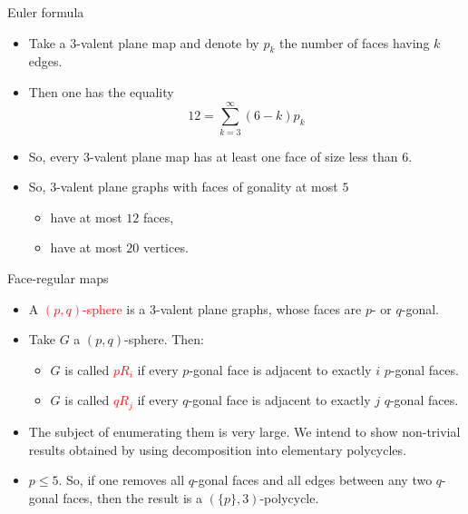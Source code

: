 \documentclass[%
pdf,
colorBG,
slideColor,
]{prosper}
\begin{document}
\begin{slide}{Euler formula}
\begin{itemize}
\item Take a $3$-valent plane map and denote by $p_k$ the number of faces having $k$ edges.
\item Then one has the equality
\begin{equation*}
12=\sum_{k=3}^{\infty} (6-k) p_k
\end{equation*}
\item So, every $3$-valent plane map has at least one face of size less than $6$.
\item So, $3$-valent plane graphs with faces of gonality at most $5$
\begin{itemize}
\item have at most $12$ faces,
\item have at most $20$ vertices.
\end{itemize}
\end{itemize}
\end{slide}




\begin{slide}{Face-regular maps}
\begin{itemize}
\item A \textcolor{red}{$(p,q)$-sphere} is a $3$-valent plane graphs, whose faces are $p$- or $q$-gonal.
\item Take $G$ a $(p,q)$-sphere. Then:
\begin{itemize}
\item $G$ is called \textcolor{red}{$pR_i$} if every $p$-gonal face is adjacent to exactly $i$ $p$-gonal faces.
\item $G$ is called \textcolor{red}{$qR_j$} if every $q$-gonal face is adjacent to exactly $j$ $q$-gonal faces.
\end{itemize}
\item The subject of enumerating them is very large. We intend to show non-trivial results obtained by using decomposition into elementary polycycles.
\item $p\leq 5$. So, if one removes all $q$-gonal faces and all edges between any two $q$-gonal faces, then the result is a $(\{p\}, 3)$-polycycle.
\end{itemize}
\end{slide}
\end{document}
